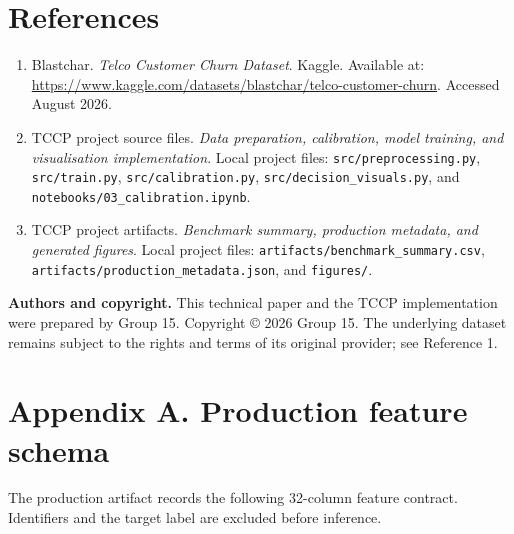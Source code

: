 \documentclass[9pt]{article}
\begin{document}
\section*{References}
\begin{enumerate}[leftmargin=*]
\item Blastchar. \textit{Telco Customer Churn Dataset}. Kaggle. Available at: \href{https://www.kaggle.com/datasets/blastchar/telco-customer-churn}{https://www.kaggle.com/datasets/blastchar/telco-customer-churn}. Accessed August 2026.
\item TCCP project source files. \textit{Data preparation, calibration, model training, and visualisation implementation}. Local project files: \texttt{src/preprocessing.py}, \texttt{src/train.py}, \texttt{src/calibration.py}, \texttt{src/decision\_visuals.py}, and \texttt{notebooks/03\_calibration.ipynb}.
\item TCCP project artifacts. \textit{Benchmark summary, production metadata, and generated figures}. Local project files: \texttt{artifacts/benchmark\_summary.csv}, \texttt{artifacts/production\_metadata.json}, and \texttt{figures/}.
\end{enumerate}

\vspace{0.3cm}
\textbf{Authors and copyright.} This technical paper and the TCCP implementation were prepared by Group 15. Copyright \copyright{} 2026 Group 15. The underlying dataset remains subject to the rights and terms of its original provider; see Reference 1.

\newpage
\section*{Appendix A. Production feature schema}
The production artifact records the following 32-column feature contract. Identifiers and the target label are excluded before inference.
\end{document}
